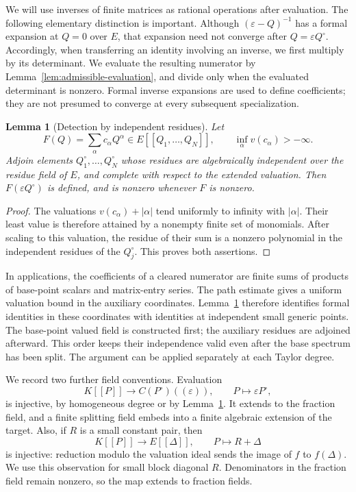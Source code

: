 \documentclass[11pt]{article}
\newtheorem{lemma}[theorem]{Lemma}
\theoremstyle{definition}
\theoremstyle{remark}
\numberwithin{equation}{section}
\begin{document}
We will use inverses of finite matrices as rational operations after
evaluation.  The following elementary distinction is important.
Although $(\varepsilon-Q)^{-1}$ has a formal expansion at $Q=0$ over
$E$, that expansion need not converge after $Q=\varepsilon Q^\circ$.
Accordingly, when transferring an identity involving an inverse, we
first multiply by its determinant.  We evaluate the resulting
numerator by Lemma~\ref{lem:admissible-evaluation}, and divide only
when the evaluated determinant is nonzero.  Formal inverse expansions
are used to define coefficients; they are not presumed to converge at
every subsequent specialization.

\begin{lemma}[Detection by independent residues]\label{lem:generic-detection}
Let
\[
 F(Q)=\sum_\alpha c_\alpha Q^\alpha\in E[[Q_1,\ldots,Q_N]],
 \qquad \inf_\alpha v(c_\alpha)>-\infty.
\]
Adjoin elements $Q_1^\circ,\ldots,Q_N^\circ$ whose residues are
algebraically independent over the residue field of $E$, and complete
with respect to the extended valuation.  Then
$F(\varepsilon Q^\circ)$ is defined, and is nonzero whenever $F$ is
nonzero.
\end{lemma}

\begin{proof}
The valuations $v(c_\alpha)+|\alpha|$ tend uniformly to infinity
with $|\alpha|$.  Their least value is therefore attained by a
nonempty finite set of monomials.  After scaling to this valuation,
the residue of their sum is a nonzero polynomial in the independent
residues of the $Q_j^\circ$.  This proves both assertions.
\end{proof}

In applications, the coefficients of a cleared numerator are finite
sums of products of base-point scalars and matrix-entry series.
The path estimate gives a uniform valuation bound in the auxiliary
coordinates.  Lemma~\ref{lem:generic-detection} therefore identifies
formal identities in these coordinates with identities at independent
small generic points.  The base-point valued field is constructed
first; the auxiliary residues are adjoined afterward.  This order
keeps their independence valid even after the base spectrum has been
split.  The argument can be applied separately at each Taylor degree.

We record two further field conventions.  Evaluation
\[
 K[[P]]\longrightarrow C(P^\circ)((\varepsilon)),
 \qquad P\longmapsto\varepsilon P^\circ,
\]
is injective, by homogeneous degree or by
Lemma~\ref{lem:generic-detection}.  It extends to the fraction field,
and a finite splitting field embeds into a finite algebraic extension
of the target.  Also, if $R$ is a small constant pair, then
\begin{equation}
K[[P]]\longrightarrow E[[\Delta]],\qquad P\longmapsto R+\Delta
 \label{eq:generic-taylor-embedding}
\end{equation}
is injective: reduction modulo the valuation ideal sends the image of
$f$ to $f(\Delta)$.  We use this observation for small block diagonal
$R$.  Denominators in the fraction field remain nonzero, so the map
extends to fraction fields.
\end{document}
